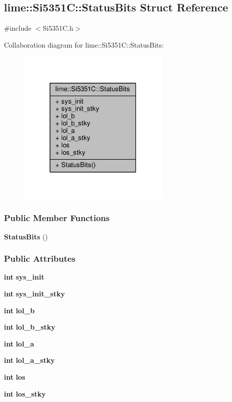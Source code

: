 \subsection{lime\+:\+:Si5351C\+:\+:Status\+Bits Struct Reference}
\label{structlime_1_1Si5351C_1_1StatusBits}


{\ttfamily \#include $<$Si5351\+C.\+h$>$}



Collaboration diagram for lime\+:\+:Si5351C\+:\+:Status\+Bits\+:
\nopagebreak
\begin{figure}[H]
\begin{center}
\leavevmode
\includegraphics[width=210pt]{d1/d68/structlime_1_1Si5351C_1_1StatusBits__coll__graph}
\end{center}
\end{figure}
\subsubsection*{Public Member Functions}
\begin{DoxyCompactItemize}
\item 
{\bf Status\+Bits} ()
\end{DoxyCompactItemize}
\subsubsection*{Public Attributes}
\begin{DoxyCompactItemize}
\item 
{\bf int} {\bf sys\+\_\+init}
\item 
{\bf int} {\bf sys\+\_\+init\+\_\+stky}
\item 
{\bf int} {\bf lol\+\_\+b}
\item 
{\bf int} {\bf lol\+\_\+b\+\_\+stky}
\item 
{\bf int} {\bf lol\+\_\+a}
\item 
{\bf int} {\bf lol\+\_\+a\+\_\+stky}
\item 
{\bf int} {\bf los}
\item 
{\bf int} {\bf los\+\_\+stky}
\end{DoxyCompactItemize}


